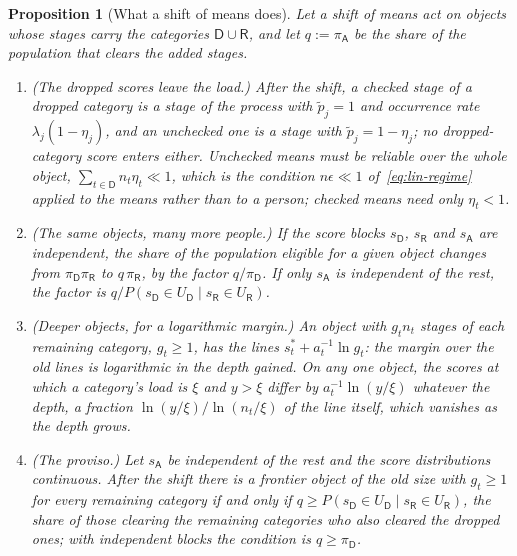 \documentclass{article}
\newtheorem{proposition}{Proposition}
\begin{document}
\begin{proposition}[What a shift of means does]\label{prop:means}
Let a shift of means act on objects whose stages carry the categories $\mathsf{D} \cup \mathsf{R}$, and let $q := \pi_{\mathsf{A}}$ be the share of the population that clears the added stages.
\begin{enumerate}
  \item[(i)] \emph{(The dropped scores leave the load.)} After the shift, a checked stage of a dropped category is a stage of the process with $\widetilde{p}_j = 1$ and occurrence rate $\lambda_j(1 - \eta_j)$, and an unchecked one is a stage with $\widetilde{p}_j = 1 - \eta_j$; no dropped-category score enters either. Unchecked means must be reliable over the whole object, $\sum_{t \in \mathsf{D}} n_t\eta_t \ll 1$, which is the condition $n\epsilon \ll 1$ of~\eqref{eq:lin-regime} applied to the means rather than to a person; checked means need only $\eta_t < 1$.
  \item[(ii)] \emph{(The same objects, many more people.)} If the score blocks $s_{\mathsf{D}}$, $s_{\mathsf{R}}$ and $s_{\mathsf{A}}$ are independent, the share of the population eligible for a given object changes from $\pi_{\mathsf{D}}\pi_{\mathsf{R}}$ to $q\,\pi_{\mathsf{R}}$, by the factor $q/\pi_{\mathsf{D}}$. If only $s_{\mathsf{A}}$ is independent of the rest, the factor is $q/P(s_{\mathsf{D}} \in U_{\mathsf{D}} \mid s_{\mathsf{R}} \in U_{\mathsf{R}})$.
  \item[(iii)] \emph{(Deeper objects, for a logarithmic margin.)} An object with $g_t n_t$ stages of each remaining category, $g_t \geq 1$, has the lines $s^{\ast}_t + a_t^{-1}\ln g_t$: the margin over the old lines is logarithmic in the depth gained. On any one object, the scores at which a category's load is $\xi$ and $y > \xi$ differ by $a_t^{-1}\ln(y/\xi)$ whatever the depth, a fraction $\ln(y/\xi)/\ln(n_t/\xi)$ of the line itself, which vanishes as the depth grows.
  \item[(iv)] \emph{(The proviso.)} Let $s_{\mathsf{A}}$ be independent of the rest and the score distributions continuous. After the shift there is a frontier object of the old size with $g_t \geq 1$ for every remaining category if and only if $q \geq P(s_{\mathsf{D}} \in U_{\mathsf{D}} \mid s_{\mathsf{R}} \in U_{\mathsf{R}})$, the share of those clearing the remaining categories who also cleared the dropped ones; with independent blocks the condition is $q \geq \pi_{\mathsf{D}}$.
\end{enumerate}
\end{proposition}
\end{document}
